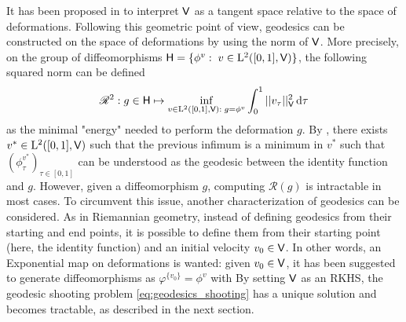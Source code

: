 It has been proposed in \cite{miller2006geodesic} to interpret $\mathsf{V}$ as a tangent space relative to the space of deformations.
Following this geometric point of view, geodesics can be constructed on the space of deformations by using the norm of $\mathsf{V}$. 
More precisely, on the group of diffeomorphisms $\mathsf{H}=\{ \phi^v:\; v\in \mathrm{L}^2([0,1],\mathsf{V})\}$,
 the following squared norm can be defined
 \begin{equation}
  \label{eq:geodesics_original}
    \mathscr{R}^2: g\in \mathsf{H}\mapsto \inf_{ v\in \mathrm{L}^2([0,1],\mathsf{V}):\; g=\phi^v} \int_0^1 || v_\tau||_{\mathsf{V}}^2\mathop{}\!\mathrm{d} \tau
 \end{equation}
     as the minimal "energy" needed to perform the deformation $g$.
By \citep[Theorem 6]{glaunes2005transport}, there exists $v^*\in \mathrm{L}^2([0,1],\mathsf{V})$ such that the previous infimum is a minimum in $v^*$ such that $(\phi^{v^*}_\tau)_{\tau\in[0,1]}$ can be understood as the geodesic between the identity function and $g$.
However, given a diffeomorphism $g$, computing $\mathscr{R}(g)$ is intractable in most cases. 
To circumvent this issue, another characterization of geodesics can be considered.
 As in Riemannian geometry, 
 instead of defining geodesics from their starting and end points, it is possible to define them from their starting point (here, the identity function) and an initial velocity $v_0\in\mathsf{V}$.
 In other words, an Exponential map on deformations is wanted:
given $v_0\in\mathsf{V}$, it has been suggested to generate diffeomorphisms as $\varphi^{\{v_0\}}=\phi^v$ with
 By setting $\mathsf{V}$ as an RKHS, the geodesic shooting problem \eqref{eq:geodesics_shooting} has a unique solution and becomes tractable, as described in the next section.





